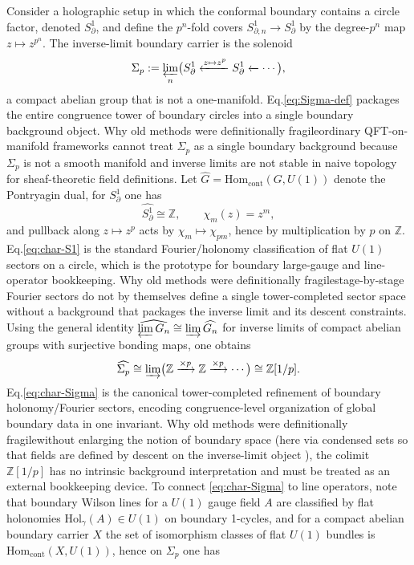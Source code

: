 \documentclass[11pt]{article}
\theoremstyle{remark}
\newcommand{\Z}{\mathbb{Z}}
\begin{document}
Consider a holographic setup in which the conformal boundary contains a circle factor, denoted \(S^{1}_{\partial}\), and define the \(p^{n}\)-fold covers \(S^{1}_{\partial,n}\to S^{1}_{\partial}\) by the degree-\(p^{n}\) map \(z\mapsto z^{p^{n}}\). The inverse-limit boundary carrier is the solenoid
\begin{equation}\label{eq:Sigma-def}
\Sigma_{p}:=\varprojlim_{n}\bigl(S^{1}_{\partial}\xleftarrow{z\mapsto z^{p}}S^{1}_{\partial}\xleftarrow{}\cdots\bigr),
\end{equation}
a compact abelian group that is not a one-manifold. Eq.\eqref{eq:Sigma-def} packages the entire congruence tower of boundary circles into a single boundary background object. Why old methods were definitionally fragile\:ordinary QFT-on-manifold frameworks cannot treat \(\Sigma_{p}\) as a single boundary background because \(\Sigma_{p}\) is not a smooth manifold and inverse limits are not stable in naive topology for sheaf-theoretic field definitions. Let \(\widehat{G}=\mathrm{Hom}_{\mathrm{cont}}(G,U(1))\) denote the Pontryagin dual, for \(S^{1}_{\partial}\) one has
\begin{equation}\label{eq:char-S1}
\widehat{S^{1}_{\partial}}\cong \Z,\qquad \chi_{m}(z)=z^{m},
\end{equation}
and pullback along \(z\mapsto z^{p}\) acts by \(\chi_{m}\mapsto \chi_{pm}\), hence by multiplication by \(p\) on \(\Z\). Eq.\eqref{eq:char-S1} is the standard Fourier/holonomy classification of flat \(U(1)\) sectors on a circle, which is the prototype for boundary large-gauge and line-operator bookkeeping. Why old methods were definitionally fragile\:stage-by-stage Fourier sectors do not by themselves define a single tower-completed sector space without a background that packages the inverse limit and its descent constraints. Using the general identity \(\widehat{\varprojlim G_n}\cong \varinjlim \widehat{G_n}\) for inverse limits of compact abelian groups with surjective bonding maps, one obtains
\begin{equation}\label{eq:char-Sigma}
\widehat{\Sigma_{p}}\cong \varinjlim\bigl(\Z\xrightarrow{\times p}\Z\xrightarrow{\times p}\cdots\bigr)\cong \Z[1/p].
\end{equation}
Eq.\eqref{eq:char-Sigma} is the canonical tower-completed refinement of boundary holonomy/Fourier sectors, encoding congruence-level organization of global boundary data in one invariant. Why old methods were definitionally fragile\:without enlarging the notion of boundary space (here via condensed sets so that fields are defined by descent on the inverse-limit object \cite{ClausenScholze}), the colimit \(\Z[1/p]\) has no intrinsic background interpretation and must be treated as an external bookkeeping device. To connect \eqref{eq:char-Sigma} to line operators, note that boundary Wilson lines for a \(U(1)\) gauge field \(A\) are classified by flat holonomies \(\mathrm{Hol}_{\gamma}(A)\in U(1)\) on boundary 1-cycles, and for a compact abelian boundary carrier \(X\) the set of isomorphism classes of flat \(U(1)\) bundles is \(\mathrm{Hom}_{\mathrm{cont}}(X,U(1))\), hence on \(\Sigma_{p}\) one has
\end{document}
